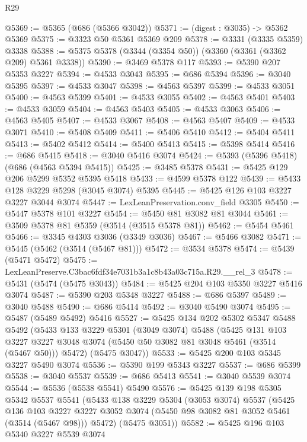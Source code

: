 \begin{lexlean}{R29}
\begin{coremodule}
@5369 := @5365 (@686 (@5366 @3042))
@5371 := (digest : @3035) -> @5362 @5369
@5375 := @3323 @50 @5361 @5369 @209
@5378 := @3331 (@3335 @5359) @3338
@5388 := @5375 @5378 (@3344 (@3354 @50)) (@3360 (@3361 (@3362 @209) @5361 @3338))
@5390 := @3469 @5378 @117
@5393 := @5390 @207 @5353 @3227
@5394 := @4533 @3043
@5395 := @686 @5394
@5396 := @3040 @5395
@5397 := @4533 @3047
@5398 := @4563 @5397
@5399 := @4533 @3051
@5400 := @4563 @5399
@5401 := @4533 @3055
@5402 := @4563 @5401
@5403 := @4533 @3059
@5404 := @4563 @5403
@5405 := @4533 @3063
@5406 := @4563 @5405
@5407 := @4533 @3067
@5408 := @4563 @5407
@5409 := @4533 @3071
@5410 := @5408 @5409
@5411 := @5406 @5410
@5412 := @5404 @5411
@5413 := @5402 @5412
@5414 := @5400 @5413
@5415 := @5398 @5414
@5416 := @686 @5415
@5418 := @3040 @5416 @3074
@5424 := @5393 (@5396 @5418) (@686 (@4563 @5394 @5415))
@5425 := @3485 @5378
@5431 := @5425 @129 @206 @5299 @5352 @5395 @5418
@5433 := @4599 @5378 @122
@5439 := @5433 @128 @3229 @5298 (@3045 @3074) @5395
@5445 := @5425 @126 @103 @3227 @3227 @3044 @3074
@5447 := LexLeanPreservation.conv_field @3305
@5450 := @5447 @5378 @101 @3227
@5454 := @5450 @81 @3082 @81 @3044
@5461 := @3509 @5378 @81 @5359 (@3514 (@3515 @5378 @81))
@5462 := @5454 @5461
@5466 := @3345 @4303 @3036 (@3349 @3036)
@5467 := @5466 @3082
@5471 := @5445 (@5462 (@3514 (@5467 @81)))
@5472 := @3534 @5378
@5474 := @5439 (@5471 @5472)
@5475 := LexLeanPreserve.C3bac6fdf34e7031b3a1c8b43a03c715a.R29.__rel_3
@5478 := @5431 (@5474 (@5475 @3043))
@5484 := @5425 @204 @103 @5350 @3227 @5416 @3074
@5487 := @5390 @203 @5348 @3227
@5488 := @686 @5397
@5489 := @3040 @5488
@5490 := @686 @5414
@5492 := @3040 @5490 @3074
@5495 := @5487 (@5489 @5492) @5416
@5527 := @5425
    @134
    @202
    @5302
    @5347
    @5488
    @5492
    (@5433
      @133
      @3229
      @5301
      (@3049 @3074)
      @5488
      (@5425
        @131
        @103
        @3227
        @3227
        @3048
        @3074
        (@5450 @50 @3082 @81 @3048 @5461 (@3514 (@5467 @50)))
        @5472)
      (@5475 @3047))
@5533 := @5425 @200 @103 @5345 @3227 @5490 @3074
@5536 := @5390 @199 @5343 @3227
@5537 := @686 @5399
@5538 := @3040 @5537
@5539 := @686 @5413
@5541 := @3040 @5539 @3074
@5544 := @5536 (@5538 @5541) @5490
@5576 := @5425
    @139
    @198
    @5305
    @5342
    @5537
    @5541
    (@5433
      @138
      @3229
      @5304
      (@3053 @3074)
      @5537
      (@5425
        @136
        @103
        @3227
        @3227
        @3052
        @3074
        (@5450 @98 @3082 @81 @3052 @5461 (@3514 (@5467 @98)))
        @5472)
      (@5475 @3051))
@5582 := @5425 @196 @103 @5340 @3227 @5539 @3074

\end{coremodule}
\end{lexlean}
